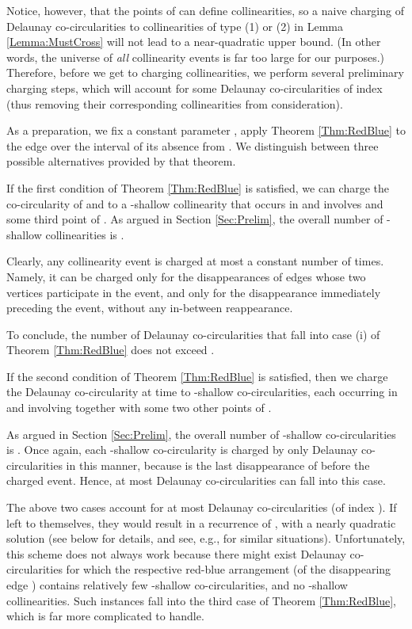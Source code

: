 \documentclass[letter,11pt]{article}
\begin{document}
Notice, however, that the points of  can define  collinearities, so a naive charging of Delaunay co-circularities to collinearities of type (1) or (2) in Lemma \ref{Lemma:MustCross} will not lead to a near-quadratic upper bound. (In other words, the universe of {\it all} collinearity events is far too large for our purposes.) Therefore, before we get to charging collinearities, we perform several preliminary charging steps, which will account for some Delaunay co-circularities of index  (thus removing their corresponding collinearities from consideration). 

As a preparation, we fix a constant parameter , apply Theorem \ref{Thm:RedBlue} to the edge  over the interval  of its absence from . We distinguish between three possible alternatives provided by that theorem.

\smallskip
{} If the first condition of Theorem \ref{Thm:RedBlue} is satisfied, we can charge the co-circularity of  and  to a -shallow collinearity that occurs in  and involves  and some third point of . As argued in Section \ref{Sec:Prelim}, the overall number of -shallow collinearities is .

Clearly, any collinearity event is charged at most a constant number of times. Namely, it can be charged only for the disappearances of edges  whose two vertices  participate in the event, and only for the disappearance immediately preceding the event, without any in-between reappearance.

To conclude, the number of Delaunay co-circularities that fall into case (i) of Theorem \ref{Thm:RedBlue} does not exceed .

\smallskip
{} If the second condition of Theorem \ref{Thm:RedBlue} is satisfied, then we charge the Delaunay co-circularity at time  to  -shallow co-circularities, each occurring in  and involving  together with some two other points of .

As argued in Section \ref{Sec:Prelim}, the overall number of -shallow co-circularities is . Once again, each -shallow co-circularity is charged by only  Delaunay co-circularities in this manner, because  is the last disappearance of  before the charged event. Hence, at most  Delaunay co-circularities can fall into this case.

The above two cases account for at most  Delaunay co-circularities (of index ). If left to themselves, they would result in a recurrence of , with a nearly quadratic solution (see below for details, and see, e.g., \cite{ASS} for similar situations).
Unfortunately, this scheme does not always work because there might exist Delaunay co-circularities for which the respective red-blue arrangement (of the disappearing edge ) contains relatively few -shallow co-circularities, and no -shallow collinearities.
Such instances fall into the third case of Theorem \ref{Thm:RedBlue}, which is far more complicated to handle.
\end{document}
